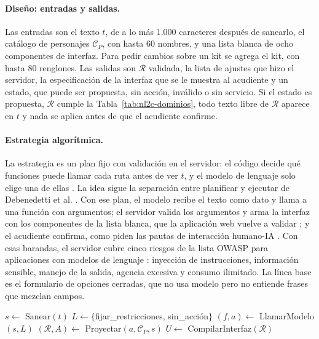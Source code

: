 \paragraph{Diseño: entradas y salidas.} Las entradas son el texto $t$, de a lo más 1.000 caracteres
después de sanearlo, el catálogo de personajes $\mathcal{C}_P$, con hasta 60 nombres, y una lista
blanca de ocho componentes de interfaz. Para pedir cambios sobre un kit se agrega el kit, con hasta
80 renglones. Las salidas son $\mathcal{R}$ validada, la lista de ajustes que hizo el servidor, la
especificación de la interfaz que se le muestra al acudiente y un estado, que puede ser propuesta,
sin acción, inválido o sin servicio. Si el estado es propuesta, $\mathcal{R}$ cumple la
Tabla~\ref{tab:nl2c-dominios}, todo texto libre de $\mathcal{R}$ aparece en $t$ y nada se aplica
antes de que el acudiente confirme.

\paragraph{Estrategia algorítmica.} La estrategia es un plan fijo con validación en el servidor: el
código decide qué funciones puede llamar cada ruta antes de ver $t$, y el modelo de lenguaje solo
elige una de ellas \citep{beurerkellner2025patterns}. La idea sigue la separación entre planificar y
ejecutar de Debenedetti et al. \citep{debenedetti2025camel}. Con ese plan, el modelo recibe el texto como dato y llama a
una función con argumentos; el servidor valida los argumentos y arma la interfaz con los componentes
de la lista blanca, que la aplicación web vuelve a validar \citep{chen2025genui}; y el acudiente
confirma, como piden las pautas de interacción humano-IA \citep{amershi_guidelines_2019}. Con esas
barandas, el servidor cubre cinco riesgos de la lista OWASP para aplicaciones con modelos de
lenguaje \citep{owasp2025llm}: inyección de instrucciones, información sensible, manejo de la
salida, agencia excesiva y consumo ilimitado. La línea base es el formulario de opciones cerradas, que no usa modelo pero no entiende frases que mezclan campos.

\begin{algorithm}[!htb]
\caption{Interpretación de una preferencia en lenguaje natural}
\label{alg:nl2c}
$s\leftarrow$ Sanear$(t)$ 
$L\leftarrow\{$fijar\_restricciones, sin\_acción$\}$ 
$(f,a)\leftarrow$ LlamarModelo$(s,L)$ 
$(\mathcal{R},A)\leftarrow$ Proyectar$(a,\mathcal{C}_P,s)$ 
$U\leftarrow$ CompilarInterfaz$(\mathcal{R})$ 
 
\end{algorithm}

